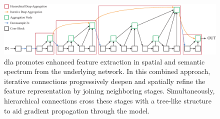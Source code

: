 \begin{figure}[t]
    \centerline{\includegraphics[width=\linewidth]{figures/theoretical_foundations/dla_ida_hda_combination.pdf}}
    \caption[Combination of \gls{dla} approaches]{\Gls{dla} promotes enhanced feature extraction in spatial and semantic spectrum from the underlying network. In this combined approach, iterative connections progressively deepen and spatially refine the feature representation by joining neighboring stages. Simultaneously, hierarchical connections cross these stages with a tree-like structure to aid gradient propagation through the model. }
    \label{fig:DLACombination}
\end{figure}
